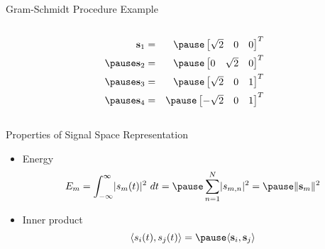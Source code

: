 \documentclass[t]{beamer}
\begin{document}
\begin{frame}{Gram-Schmidt Procedure Example}
\begin{columns}
  \pause
  \begin{column}{0.6\textwidth}
    \begin{figure}
      \centering
    \end{figure}
    \pause
    \begin{eqnarray*}
      \mathbf{s}_1 & = & \pause \begin{bmatrix} \sqrt{2} & 0 & 0 \end{bmatrix}^T \\
      \pause
      \mathbf{s}_2 & = & \pause \begin{bmatrix} 0 & \sqrt{2} & 0 \end{bmatrix}^T \\
      \pause
      \mathbf{s}_3 & = & \pause \begin{bmatrix} \sqrt{2} & 0 & 1 \end{bmatrix}^T \\
      \pause
      \mathbf{s}_4 & = & \pause \begin{bmatrix} -\sqrt{2} & 0 & 1 \end{bmatrix}^T 
    \end{eqnarray*}
    \end{column}
  \end{columns}
  \normalsize
\end{frame}

\begin{frame}{Properties of Signal Space Representation}
  \footnotesize
  \begin{itemize}
    \item Energy
      \begin{equation*}
        E_m = \int_{-\infty}^{\infty} \lvert s_m(t) \rvert^2 \ dt = \pause \sum_{n=1}^N \lvert s_{m,n} \rvert^2 = \pause \lVert \mathbf{s}_m \rVert^2
      \end{equation*}
    \pause
    \item Inner product
      \begin{equation*}
        \langle s_i(t), s_j(t) \rangle = \pause \langle \mathbf{s}_i,\mathbf{s}_j \rangle
      \end{equation*}
  \end{itemize}
  \normalsize
\end{frame}
\end{document}
